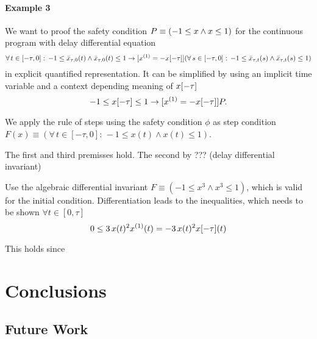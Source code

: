 \documentclass[10pt]{report}
\begin{document}
        \subsubsection{Example 3}
            \label{sec:ddi-example-3}

            We want to proof the safety condition $P\equiv(-1\leq x\wedge x\leq 1)$ for the continuous program with delay differential equation
            \begin{equation}
                \forall\,t\in[-\tau,0]:\,-1\leq\xbartaut{0}(t)\wedge\xbartaut{0}(t)\leq 1
                \rightarrow
                [\D{x}=-\xtau] (\forall\,s\in[-\tau,0]:\,-1\leq\xbartaut{t}(s)\wedge\xbartaut{t}(s)\leq 1)
            \end{equation}
            in explicit quantified representation. It can be simplified by using an implicit time variable and a context depending meaning of $x[-\tau]$
            \begin{equation}
                -1\leq\xtau\leq 1 \rightarrow [\D{x}=-\xtau]\asfml.
            \end{equation}

            We apply the rule of steps using the safety condition $\phi$ as step condition $F(x)\equiv(\forall\,t\in[-\tau,0]:\,-1\leq x(t)\wedge x(t)\leq 1)$.

            The first and third premisses hold. The second by ??? (delay differential invariant)

            Use the algebraic differential invariant $F\equiv(-1\leq x^3\wedge x^3\leq1)$, which is valid for the initial condition. Differentiation leads to the inequalities, which needs to be shown $\forall t\in[0,\tau]$
            \begin{equation}
                0\leq 3\,x(t)^2 \D{x}(t) = -3\,x(t)^2 \xtau(t)
            \end{equation}

            This holds since

\chapter{Conclusions}
    \section{Future Work}


\nocite{*}


\end{document}
